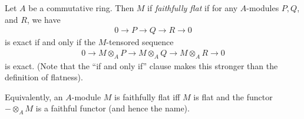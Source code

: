 \documentclass[12pt]{article}
\newcommand{\ra}{\rightarrow}
\newcommand{\<}{\langle}
\renewcommand{\>}{\rangle}
\begin{document}
Let $A$ be a commutative ring.  Then $M$ if \emph{faithfully flat} if for any $A$-modules $P, Q$, and $R$, we have
\begin{align*}
0\ra P\ra Q\ra R\ra 0
\end{align*}
is exact if and only if the $M$-tensored sequence
\begin{align*}
0\ra M\otimes_A P\ra M\otimes_A Q\ra M\otimes_A R\ra 0
\end{align*}
is exact.  (Note that the ``if and only if'' clause makes this stronger than the definition of flatness).

Equivalently, an $A$-module $M$ is faithfully flat iff $M$ is flat and the functor $-\otimes_A M$ is a faithful functor (and hence the name).
\end{document}
